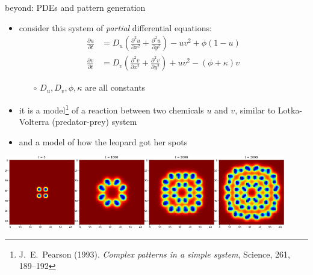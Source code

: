 \documentclass[dvipsnames,colorlinks]{beamer}
\begin{document}
\begin{frame}{beyond: PDEs and pattern generation}

\small
\begin{itemize}
\item consider this system of \emph{partial} differential equations:
\scriptsize
\begin{align*}
\frac{\partial u}{\partial t} &= D_u \left(\frac{\partial^2 u}{\partial x^2} + \frac{\partial^2 u}{\partial y^2}\right) -uv^2+\phi(1-u) \\
\frac{\partial v}{\partial t} &= D_v \left(\frac{\partial^2 v}{\partial x^2} + \frac{\partial^2 v}{\partial y^2}\right) + uv^2-(\phi+\kappa)v
\end{align*}
\small

    \begin{itemize}
    \item[$\circ$] $D_u,D_v,\phi,\kappa$ are all constants
    \end{itemize}
\item it is a model\footnote{\tiny J.~E.~Pearson (1993). \emph{Complex patterns in a simple system}, Science, 261, 189--192} of a reaction between two chemicals $u$ and $v$, similar to Lotka-Volterra (predator-prey) system
\item and a model of how the leopard got her spots
\end{itemize}

\mbox{\includegraphics[width=0.23\textwidth]{figs/pattern0}\quad\includegraphics[width=0.23\textwidth]{figs/pattern2}\quad\includegraphics[width=0.23\textwidth]{figs/pattern4}\quad\includegraphics[width=0.23\textwidth]{figs/pattern6}}

\bigskip
\end{frame}
\end{document}
